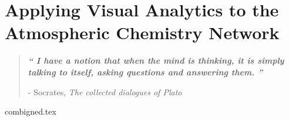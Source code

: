 

\chapter{Applying Visual Analytics to the Atmospheric Chemistry Network}\label{ch3}


\blankpage
\restoregeometry
\vspace*{0.15\paperheight}



\begin{center}
\begin{quotation}
  \large{\emph{\textbf{`` I have a notion that when the mind is thinking, it is simply talking to itself, asking questions and answering them. ''} }  }  \\
  \begin{flushright}
  - Socrates, \textit{The collected dialogues of Plato} 
  \end{flushright}
 \end{quotation}
\end{center}
\doublespacing
\newpage

% 
 
 
{combigned.tex} 

\chapterbib






